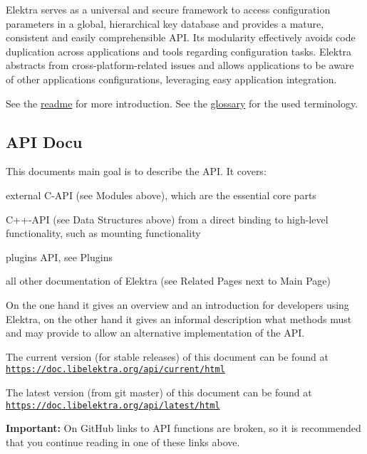 Elektra serves as a universal and secure framework to access configuration parameters in a global, hierarchical key database and provides a mature, consistent and easily comprehensible A\+PI. Its modularity effectively avoids code duplication across applications and tools regarding configuration tasks. Elektra abstracts from cross-\/platform-\/related issues and allows applications to be aware of other applications\textquotesingle{} configurations, leveraging easy application integration.

See the \hyperlink{README_md}{readme} for more introduction. See the \hyperlink{doc_help_elektra-glossary_md}{glossary} for the used terminology.

\subsection*{A\+PI Docu}

This document\textquotesingle{}s main goal is to describe the A\+PI. It covers\+:


\begin{DoxyItemize}
\item external C-\/\+A\+PI (see Modules above), which are the essential core parts
\item C++-\/\+A\+PI (see Data Structures above) from a direct binding to high-\/level functionality, such as mounting functionality
\item plugins A\+PI, see Plugins
\item all other documentation of Elektra (see Related Pages next to Main Page)
\end{DoxyItemize}

On the one hand it gives an overview and an introduction for developers using Elektra, on the other hand it gives an informal description what methods must and may provide to allow an alternative implementation of the A\+PI.

The current version (for stable releases) of this document can be found at \href{https://doc.libelektra.org/api/current/html}{\tt https\+://doc.\+libelektra.\+org/api/current/html}

The latest version (from git master) of this document can be found at \href{https://doc.libelektra.org/api/latest/html}{\tt https\+://doc.\+libelektra.\+org/api/latest/html}

{\bfseries Important\+:} On Git\+Hub links to A\+PI functions are broken, so it is recommended that you continue reading in one of these links above.

